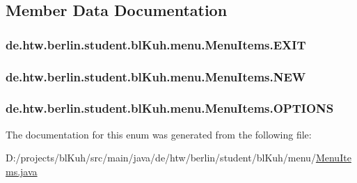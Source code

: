 \subsection{Member Data Documentation}
\hypertarget{enumde_1_1htw_1_1berlin_1_1student_1_1bl_kuh_1_1menu_1_1_menu_items_a91c5db842ee9aa831b0896a575e9909f}{
\subsubsection[{E\-X\-I\-T}]{\setlength{\rightskip}{0pt plus 5cm}de.\-htw.\-berlin.\-student.\-bl\-Kuh.\-menu.\-Menu\-Items.\-E\-X\-I\-T}}\label{enumde_1_1htw_1_1berlin_1_1student_1_1bl_kuh_1_1menu_1_1_menu_items_a91c5db842ee9aa831b0896a575e9909f}
\hypertarget{enumde_1_1htw_1_1berlin_1_1student_1_1bl_kuh_1_1menu_1_1_menu_items_a7b9c04ebd62b141b4c79c6520c4f1dc7}{
\subsubsection[{N\-E\-W}]{\setlength{\rightskip}{0pt plus 5cm}de.\-htw.\-berlin.\-student.\-bl\-Kuh.\-menu.\-Menu\-Items.\-N\-E\-W}}\label{enumde_1_1htw_1_1berlin_1_1student_1_1bl_kuh_1_1menu_1_1_menu_items_a7b9c04ebd62b141b4c79c6520c4f1dc7}
\hypertarget{enumde_1_1htw_1_1berlin_1_1student_1_1bl_kuh_1_1menu_1_1_menu_items_aadca86423f12d3f0f457ff4d0aba01e2}{
\subsubsection[{O\-P\-T\-I\-O\-N\-S}]{\setlength{\rightskip}{0pt plus 5cm}de.\-htw.\-berlin.\-student.\-bl\-Kuh.\-menu.\-Menu\-Items.\-O\-P\-T\-I\-O\-N\-S}}\label{enumde_1_1htw_1_1berlin_1_1student_1_1bl_kuh_1_1menu_1_1_menu_items_aadca86423f12d3f0f457ff4d0aba01e2}


The documentation for this enum was generated from the following file\-:\begin{DoxyCompactItemize}
\item 
D\-:/projects/bl\-Kuh/src/main/java/de/htw/berlin/student/bl\-Kuh/menu/\hyperlink{_menu_items_8java}{Menu\-Items.\-java}\end{DoxyCompactItemize}
